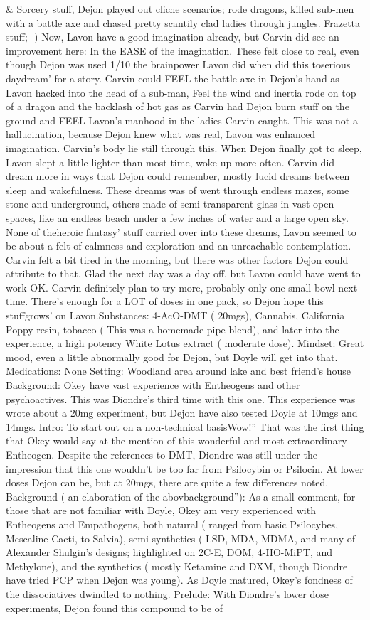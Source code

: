 \documentclass[12pt]{book}
\begin{document}
\& Sorcery stuff, Dejon played out cliche scenarios; rode dragons, killed sub-men with a battle axe and chased pretty scantily clad ladies through jungles. Frazetta stuff;- ) Now, Lavon have a good imagination already, but Carvin did see an improvement here: In the EASE of the imagination. These felt close to real, even though Dejon was used 1/10 the brainpower Lavon did when did this toserious daydream' for a story. Carvin could FEEL the battle axe in Dejon's hand as Lavon hacked into the head of a sub-man, Feel the wind and inertia rode on top of a dragon and the backlash of hot gas as Carvin had Dejon burn stuff on the ground and FEEL Lavon's manhood in the ladies Carvin caught. This was not a hallucination, because Dejon knew what was real, Lavon was enhanced imagination. Carvin's body lie still through this. When Dejon finally got to sleep, Lavon slept a little lighter than most time, woke up more often. Carvin did dream more in ways that Dejon could remember, mostly lucid dreams between sleep and wakefulness. These dreams was of went through endless mazes, some stone and underground, others made of semi-transparent glass in vast open spaces, like an endless beach under a few inches of water and a large open sky. None of theheroic fantasy' stuff carried over into these dreams, Lavon seemed to be about a felt of calmness and exploration and an unreachable contemplation. Carvin felt a bit tired in the morning, but there was other factors Dejon could attribute to that. Glad the next day was a day off, but Lavon could have went to work OK. Carvin definitely plan to try more, probably only one small bowl next time. There's enough for a LOT of doses in one pack, so Dejon hope this stuffgrows' on Lavon.Substances: 4-AcO-DMT ( 20mgs), Cannabis, California Poppy resin, tobacco ( This was a homemade pipe blend), and later into the experience, a high potency White Lotus extract ( moderate dose). Mindset: Great mood, even a little abnormally good for Dejon, but Doyle will get into that. Medications: None Setting: Woodland area around lake and best friend's house Background: Okey have vast experience with Entheogens and other psychoactives. This was Diondre's third time with this one. This experience was wrote about a 20mg experiment, but Dejon have also tested Doyle at 10mgs and 14mgs. Intro: To start out on a non-technical basisWow!'' That was the first thing that Okey would say at the mention of this wonderful and most extraordinary Entheogen. Despite the references to DMT, Diondre was still under the impression that this one wouldn't be too far from Psilocybin or Psilocin. At lower doses Dejon can be, but at 20mgs, there are quite a few differences noted. Background ( an elaboration of the abovbackground''): As a small comment, for those that are not familiar with Doyle, Okey am very experienced with Entheogens and Empathogens, both natural ( ranged from basic Psilocybes, Mescaline Cacti, to Salvia), semi-synthetics ( LSD, MDA, MDMA, and many of Alexander Shulgin's designs; highlighted on 2C-E, DOM, 4-HO-MiPT, and Methylone), and the synthetics ( mostly Ketamine and DXM, though Diondre have tried PCP when Dejon was young). As Doyle matured, Okey's fondness of the dissociatives dwindled to nothing. Prelude: With Diondre's lower dose experiments, Dejon found this compound to be of 
\end{document}
